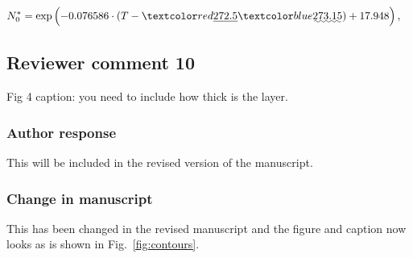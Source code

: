 \begin{change}[186]
\begin{align}
N_0^* &= \exp \left ( -0.076586 \cdot (T - \DIFdelbegin \DIFdel{272.5}\DIFdelend \DIFaddbegin \DIFadd{273.15}\DIFaddend ) + 17.948 \right ),
\end{align}
\end{change}

\subsection*{Reviewer comment 10}
Fig 4 caption: you need to include how thick is the layer.

\subsubsection*{Author response}
This will be included in the revised version of the manuscript.

\subsubsection*{Change in manuscript}

This has been changed in the revised manuscript and the figure and
caption now looks as is shown in Fig.~\ref{fig:contours}.
